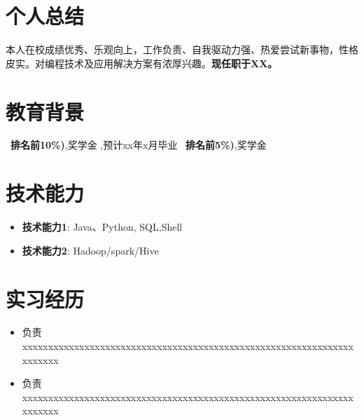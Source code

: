 \documentclass{resume}
\begin{document}


 
\section{个人总结}
本人在校成绩优秀、乐观向上，工作负责、自我驱动力强、热爱尝试新事物，性格皮实。对编程技术及应用解决方案有浓厚兴趣。\textbf{现任职于XX。}

\section{教育背景}
\ \textbf{排名前10\%)},奖学金 ,预计xx年x月毕业
\ \textbf{排名前5\%)},奖学金

\section{技术能力}
\begin{itemize}[parsep=0.2ex]
  \item \textbf{技术能力1}: Java、Python, SQL,Shell
  \item \textbf{技术能力2}: Hadoop/spark/Hive
\end{itemize}


\section{实习经历}
\begin{itemize}
  \item 负责xxxxxxxxxxxxxxxxxxxxxxxxxxxxxxxxxxxxxxxxxxxxxxxxxxxxxxxxxxxxxxxxxxxxxxx
  \item 负责xxxxxxxxxxxxxxxxxxxxxxxxxxxxxxxxxxxxxxxxxxxxxxxxxxxxxxxxxxxxxxxxxxxxxxx
\end{itemize}
\end{document}
